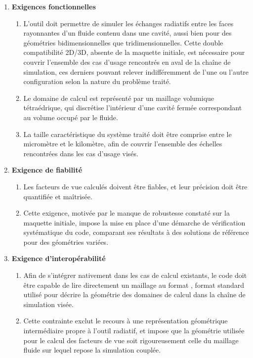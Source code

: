 \begin{enumerate}
    \item \textbf{Exigences fonctionnelles}
    \begin{enumerate}
        \item L'outil doit permettre de simuler les échanges radiatifs entre les faces rayonnantes d'un fluide contenu dans une cavité, aussi bien pour des géométries bidimensionnelles que tridimensionnelles. Cette double compatibilité 2D/3D, absente de la maquette initiale, est nécessaire pour couvrir l'ensemble des cas d'usage rencontrés en aval de la chaîne de simulation, ces derniers pouvant relever indifféremment de l'une ou l'autre configuration selon la nature du problème traité.
        \item Le domaine de calcul est représenté par un maillage volumique tétraédrique, qui discrétise l'intérieur d'une cavité fermée correspondant au volume occupé par le fluide.
        \item La taille caractéristique du système traité doit être comprise entre le micromètre et le kilomètre, afin de couvrir l'ensemble des échelles rencontrées dans les cas d'usage visés.
    \end{enumerate}
    
    \item \textbf{Exigence de fiabilité}
    \begin{enumerate}
        \item Les facteurs de vue calculés doivent être fiables, et leur précision doit être quantifiée et maîtrisée.
        \item Cette exigence, motivée par le manque de robustesse constaté sur la maquette initiale, impose la mise en place d'une démarche de vérification systématique du code, comparant ses résultats à des solutions de référence pour des géométries variées.
    \end{enumerate}
    
    \item \textbf{Exigence d'interopérabilité}
    \begin{enumerate}
        \item Afin de s'intégrer nativement dans les cas de calcul existants, le code doit être capable de lire directement un maillage au format , format standard utilisé pour décrire la géométrie des domaines de calcul dans la chaîne de simulation visée.
        \item Cette contrainte exclut le recours à une représentation géométrique intermédiaire propre à l'outil radiatif, et impose que la géométrie utilisée pour le calcul des facteurs de vue soit rigoureusement celle du maillage fluide sur lequel repose la simulation couplée.
    \end{enumerate}
    

\end{enumerate}
